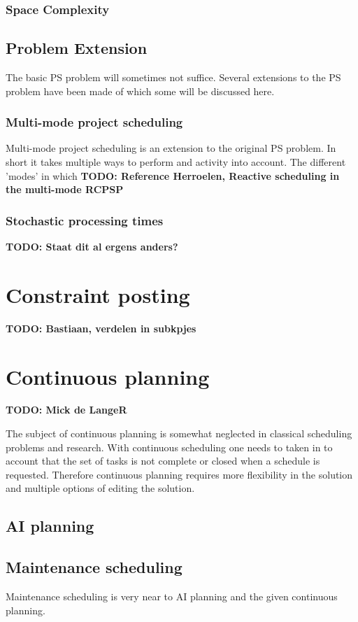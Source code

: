 \documentclass{article}
\newcommand{\TODO}[1]{{\color{red}\textbf{TODO: #1}}}
\begin{document}
\subsubsection{Space Complexity}

\subsection{Problem Extension}
The basic PS problem will sometimes not suffice. Several extensions to the PS problem have been made of which some will be discussed here. 

\subsubsection{Multi-mode project scheduling}
Multi-mode project scheduling is an extension to the original PS problem. In short it takes multiple ways to perform and activity into account. The different 'modes' in which
\TODO{Reference Herroelen, Reactive scheduling in the multi-mode RCPSP}

\subsubsection{Stochastic processing times}
\TODO{Staat dit al ergens anders?}

\section{Constraint posting}
\TODO{Bastiaan, verdelen in subkpjes}

\section{Continuous planning} \TODO{Mick de LangeR}

The subject of continuous planning is somewhat neglected in classical scheduling problems and research.
With continuous scheduling one needs to taken in to account that the set of tasks is not complete or closed when a schedule is requested.
Therefore continuous planning requires more flexibility in the solution and multiple options of editing the solution.

\subsection{AI planning}
\cite{smith00}
\cite{laborie03}

\subsection{Maintenance scheduling}
Maintenance scheduling is very near to AI planning and the given continuous planning.
\end{document}
